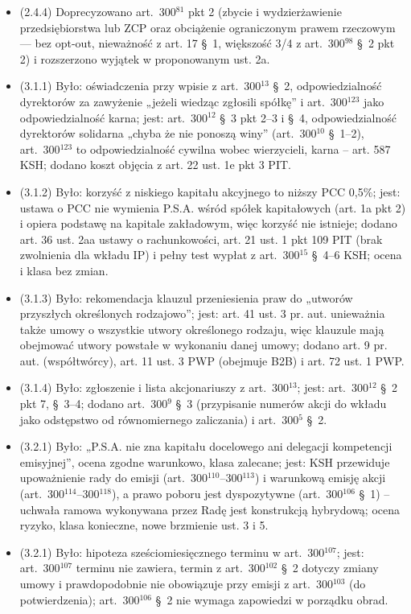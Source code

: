 \documentclass[12pt,a4paper]{report}
\begin{document}
\begin{itemize}
  \item (2.4.4) Doprecyzowano art.~300$^{81}$ pkt 2 (zbycie i wydzierżawienie przedsiębiorstwa lub ZCP oraz obciążenie ograniczonym prawem rzeczowym — bez opt-out, nieważność z art. 17 §~1, większość 3/4 z art.~300$^{98}$ §~2 pkt 2) i rozszerzono wyjątek w proponowanym ust. 2a.
  \item (3.1.1) Było: oświadczenia przy wpisie z art.~300$^{13}$ §~2, odpowiedzialność dyrektorów za zawyżenie „jeżeli wiedząc zgłosili spółkę” i art.~300$^{123}$ jako odpowiedzialność karna; jest: art.~300$^{12}$ §~3 pkt 2–3 i §~4, odpowiedzialność dyrektorów solidarna „chyba że nie ponoszą winy” (art.~300$^{10}$ §~1–2), art.~300$^{123}$ to odpowiedzialność cywilna wobec wierzycieli, karna – art. 587 KSH; dodano koszt objęcia z art. 22 ust. 1e pkt 3 PIT.
  \item (3.1.2) Było: korzyść z niskiego kapitału akcyjnego to niższy PCC 0,5\%; jest: ustawa o PCC nie wymienia P.S.A. wśród spółek kapitałowych (art. 1a pkt 2) i opiera podstawę na kapitale zakładowym, więc korzyść nie istnieje; dodano art. 36 ust. 2aa ustawy o rachunkowości, art. 21 ust. 1 pkt 109 PIT (brak zwolnienia dla wkładu IP) i pełny test wypłat z art.~300$^{15}$ §~4–6 KSH; ocena i klasa bez zmian.
  \item (3.1.3) Było: rekomendacja klauzul przeniesienia praw do „utworów przyszłych określonych rodzajowo”; jest: art. 41 ust. 3 pr. aut. unieważnia także umowy o wszystkie utwory określonego rodzaju, więc klauzule mają obejmować utwory powstałe w wykonaniu danej umowy; dodano art. 9 pr. aut. (współtwórcy), art. 11 ust. 3 PWP (obejmuje B2B) i art. 72 ust. 1 PWP.
  \item (3.1.4) Było: zgłoszenie i lista akcjonariuszy z art.~300$^{13}$; jest: art.~300$^{12}$ §~2 pkt 7, §~3–4; dodano art.~300$^{9}$ §~3 (przypisanie numerów akcji do wkładu jako odstępstwo od równomiernego zaliczania) i art.~300$^{5}$ §~2.
  \item (3.2.1) Było: „P.S.A. nie zna kapitału docelowego ani delegacji kompetencji emisyjnej”, ocena zgodne warunkowo, klasa zalecane; jest: KSH przewiduje upoważnienie rady do emisji (art.~300$^{110}$–300$^{113}$) i warunkową emisję akcji (art.~300$^{114}$–300$^{118}$), a prawo poboru jest dyspozytywne (art.~300$^{106}$ §~1) – uchwała ramowa wykonywana przez Radę jest konstrukcją hybrydową; ocena ryzyko, klasa konieczne, nowe brzmienie ust. 3 i 5.
  \item (3.2.1) Było: hipoteza sześciomiesięcznego terminu w art.~300$^{107}$; jest: art.~300$^{107}$ terminu nie zawiera, termin z art.~300$^{102}$ §~2 dotyczy zmiany umowy i prawdopodobnie nie obowiązuje przy emisji z art.~300$^{103}$ (do potwierdzenia); art.~300$^{106}$ §~2 nie wymaga zapowiedzi w porządku obrad.

\end{itemize}
\end{document}
